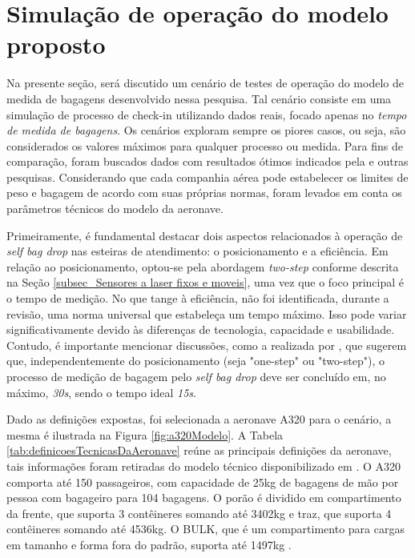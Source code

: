     
\section{Simulação de operação do modelo proposto}
\label{sec_Cenários simulados de operação do produto}

    Na presente seção, será discutido um cenário de testes de operação do modelo de medida de bagagens desenvolvido nessa pesquisa. Tal cenário consiste em uma simulação de processo de check-in utilizando dados reais, focado apenas no \textit{tempo de medida de bagagens}. Os cenários exploram sempre os piores casos, ou seja, são considerados os valores máximos para qualquer processo ou medida. Para fins de comparação, foram buscados dados com resultados ótimos indicados pela  e outras pesquisas. Considerando que cada companhia aérea pode estabelecer os limites de peso e bagagem de acordo com suas próprias normas, foram levados em conta os parâmetros técnicos do modelo da aeronave. 

    Primeiramente, é fundamental destacar dois aspectos relacionados à operação de \textit{self bag drop} nas esteiras de atendimento: o posicionamento e a eficiência. Em relação ao posicionamento, optou-se pela abordagem \textit{two-step} conforme descrita na Seção \ref{subsec_Sensores a laser fixos e moveis}, uma vez que o foco principal é o tempo de medição. No que tange à eficiência, não foi identificada, durante a revisão, uma norma universal que estabeleça um tempo máximo. Isso pode variar significativamente devido às diferenças de tecnologia, capacidade e usabilidade. Contudo, é importante mencionar discussões, como a realizada por , que sugerem que, independentemente do posicionamento (seja "one-step" ou "two-step"), o processo de medição de bagagem pelo \textit{self bag drop} deve ser concluído em, no máximo, \textit{30s}, sendo o tempo ideal \textit{15s}.

    Dado as definições expostas, foi selecionada a aeronave A320 para o cenário, a mesma é ilustrada na Figura \ref{fig:a320Modelo}. A Tabela \ref{tab:definicoesTecnicasDaAeronave} reúne as principais definições da aeronave, tais informações foram retiradas do modelo técnico disponibilizado em \cite{anacargo_2023_a320321ana}. O A320 comporta até 150 passageiros, com capacidade de 25kg de bagagens de mão por pessoa com bagageiro para 104 bagagens. O porão é dividido em compartimento da frente, que suporta 3 contêineres somando até 3402kg e traz, que suporta 4 contêineres somando até 4536kg. O BULK, que é um compartimento para cargas em tamanho e forma fora do padrão, suporta até 1497kg \cite{anacargo_2023_a320321ana, airfrance_2019_air}.


